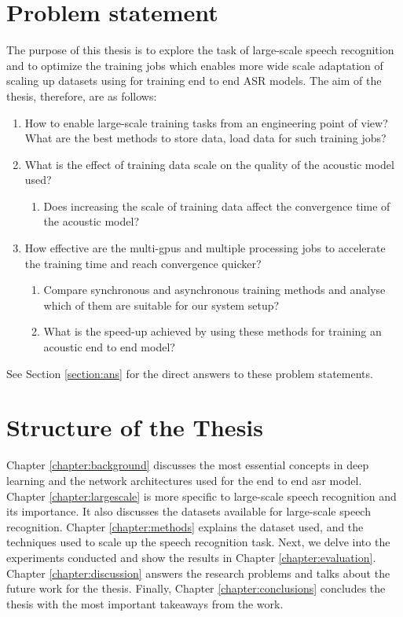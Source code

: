 \section{Problem statement}
\label{section:rq}
The purpose of this thesis is to explore the task of large-scale speech recognition and to optimize the training jobs which enables more wide scale adaptation of scaling up datasets using for training end to end ASR models. The aim of the thesis, therefore, are as follows:

\begin{enumerate}
  \item How to enable large-scale training tasks from an engineering point of view? What are the best  methods  to  store data, load data for such training jobs?
  \item What is the effect of training data scale on the quality of the acoustic model used?
    \begin{enumerate}
        \item Does increasing the scale of training data affect the convergence time of the acoustic model?
    \end{enumerate}
  \item How effective are the multi-\acrshort{gpu}s and multiple processing jobs to accelerate the training time and reach convergence quicker? 
    \begin{enumerate}
        \item Compare synchronous and asynchronous training methods and analyse which of them are suitable for our system setup? 
        \item What is the speed-up achieved by using these methods for training an acoustic end to end model?
    \end{enumerate}
\end{enumerate}

See Section \ref{section:ans} for the direct answers to these problem statements.


\section{Structure of the Thesis}
\label{section:structure} 
Chapter \ref{chapter:background} discusses the most essential concepts in deep learning and the network architectures used for the end to end \acrshort{asr} model. Chapter \ref{chapter:largescale} is more specific to large-scale speech recognition and its importance. It also discusses the datasets available for large-scale speech recognition. Chapter \ref{chapter:methods} explains the dataset used, and the techniques used to scale up the speech recognition task. Next, we delve into the experiments conducted and show the results in Chapter \ref{chapter:evaluation}. Chapter \ref{chapter:discussion} answers the research problems and  talks about the future work for the thesis. Finally, Chapter \ref{chapter:conclusions} concludes the thesis with the most important takeaways from the work.
